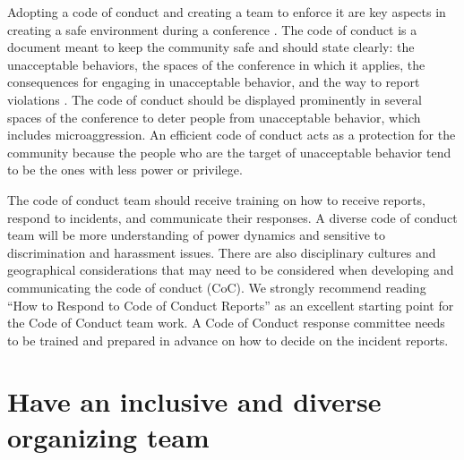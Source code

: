 \documentclass[10pt,letterpaper]{article}
\begin{document}
Adopting a code of conduct and creating a team to enforce it are key aspects in creating a safe environment during a conference \cite{favaroYourScienceConference2016}. The code of conduct is a document meant to keep the community safe and should state clearly: the unacceptable behaviors, the spaces of the conference in which it applies, the consequences for engaging in unacceptable behavior, and the way to report violations \cite{aurora2019}. 
The code of conduct should be displayed prominently in several spaces of the conference to deter people from unacceptable behavior, which includes microaggression. An efficient code of conduct acts as a protection for the community because the people who are the target of unacceptable behavior tend to be the ones with less power or privilege.

The code of conduct team should receive training on how to receive reports, respond to incidents, and communicate their responses. A diverse code of conduct team will be more understanding of power dynamics and sensitive to discrimination and harassment issues. There are also disciplinary cultures and geographical considerations that may need to be considered when developing and communicating the code of conduct (CoC). We strongly recommend reading “How to Respond to Code of Conduct Reports” \cite{aurora2019} as an excellent starting point for the Code of Conduct team work. A Code of Conduct response committee needs to be trained and prepared in advance on how to decide on the incident reports. 



\section{Have an inclusive and diverse organizing team}
\label{rule_organizing_team}
\end{document}

